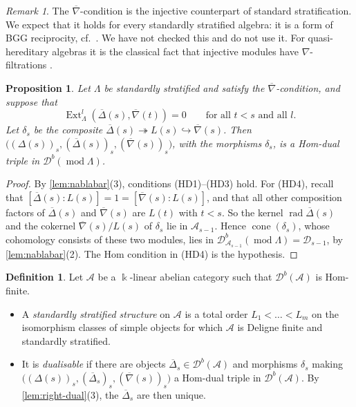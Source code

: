 \documentclass[11pt,reqno]{amsart}
\theoremstyle{plain}
\newtheorem{proposition}[theorem]{Proposition}
\theoremstyle{definition}
\newtheorem{definition}[theorem]{Definition}
\theoremstyle{remark}
\newtheorem{remark}[theorem]{Remark}
\newcommand{\kk}{\Bbbk}
\DeclareMathOperator{\Ext}{Ext}
\DeclareMathOperator{\rad}{rad}
\DeclareMathOperator{\cone}{cone}
\newcommand{\modd}{\operatorname{mod}}
\newcommand{\Db}{\mathcal{D}^b}
\newcommand{\nablabar}{\overline{\nabla}}
\newcommand{\Deltabar}{\overline{\Delta}}
\newcommand{\cD}{\mathcal{D}}
\newcommand{\cA}{\mathcal{A}}
\begin{document}
\begin{remark}
The $\nablabar$-condition is the injective counterpart of standard stratification. We expect that it holds for every standardly stratified algebra: it is a form of BGG reciprocity, cf.\ \cite{AHLU00,Dla96}. We have not checked this and do not use it. For quasi-hereditary algebras it is the classical fact that injective modules have $\nabla$-filtrations \cite{CPS88,DR92}.
\end{remark}

\begin{proposition}\label{prop:dualisable}
Let $\Lambda$ be standardly stratified and satisfy the $\nablabar$-condition, and suppose that
\[\Ext^l_\Lambda(\Deltabar(s),\nablabar(t))=0\qquad\text{for all }t<s\text{ and all }l.\]
Let $\delta_s$ be the composite $\Deltabar(s)\twoheadrightarrow L(s)\hookrightarrow\nablabar(s)$. Then $\big((\Delta(s))_s,(\Deltabar(s))_s,(\nablabar(s))_s\big)$, with the morphisms $\delta_s$, is a Hom-dual triple in $\Db(\modd\Lambda)$.
\end{proposition}

\begin{proof}
By \cref{lem:nablabar}(3), conditions (HD1)--(HD3) hold. For (HD4), recall that $[\Deltabar(s):L(s)]=1=[\nablabar(s):L(s)]$, and that all other composition factors of $\Deltabar(s)$ and $\nablabar(s)$ are $L(t)$ with $t<s$. So the kernel $\rad\Deltabar(s)$ and the cokernel $\nablabar(s)/L(s)$ of $\delta_s$ lie in $\cA_{s-1}$. Hence $\cone(\delta_s)$, whose cohomology consists of these two modules, lies in $\Db_{\cA_{s-1}}(\modd\Lambda)=\cD_{s-1}$, by \cref{lem:nablabar}(2). The Hom condition in (HD4) is the hypothesis.
\end{proof}

\begin{definition}
Let $\cA$ be a $\kk$-linear abelian category such that $\Db(\cA)$ is Hom-finite.
\begin{itemize}
\item A \emph{standardly stratified structure} on $\cA$ is a total order $L_1<\dots<L_m$ on the isomorphism classes of simple objects for which $\cA$ is Deligne finite and standardly stratified.
\item It is \emph{dualisable} if there are objects $\Deltabar_s\in\Db(\cA)$ and morphisms $\delta_s$ making $\big((\Delta(s))_s,(\Deltabar_s)_s,(\nablabar(s))_s\big)$ a Hom-dual triple in $\Db(\cA)$. By \cref{lem:right-dual}(3), the $\Deltabar_s$ are then unique.
\end{itemize}
\end{definition}
\end{document}
